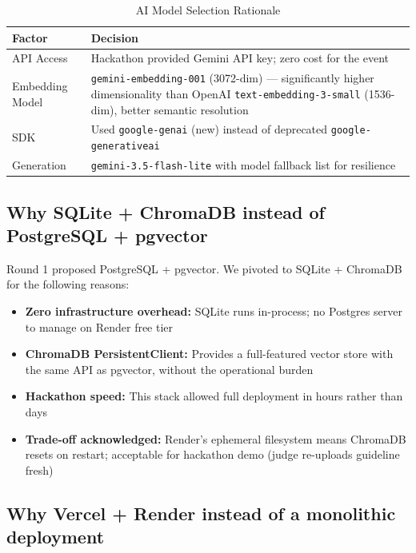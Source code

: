 \documentclass[11pt,a4paper]{article}
\begin{document}
\begin{table}[H]
\centering
\begin{tabular}{p{} p{}}
\toprule
\textbf{Factor} & \textbf{Decision} \\
\midrule
API Access & Hackathon provided Gemini API key; zero cost for the event \\
\addlinespace
Embedding Model & \texttt{gemini-embedding-001} (3072-dim) --- significantly higher dimensionality than OpenAI \texttt{text-embedding-3-small} (1536-dim), better semantic resolution \\
\addlinespace
SDK & Used \texttt{google-genai} (new) instead of deprecated \texttt{google-generativeai} \\
\addlinespace
Generation & \texttt{gemini-3.5-flash-lite} with model fallback list for resilience \\
\bottomrule
\end{tabular}
\caption{AI Model Selection Rationale}
\end{table}

\subsection{Why SQLite + ChromaDB instead of PostgreSQL + pgvector}

Round 1 proposed PostgreSQL + pgvector. We pivoted to SQLite + ChromaDB for the following reasons:

\begin{itemize}
    \item \textbf{Zero infrastructure overhead:} SQLite runs in-process; no Postgres server to manage on Render free tier
    \item \textbf{ChromaDB PersistentClient:} Provides a full-featured vector store with the same API as pgvector, without the operational burden
    \item \textbf{Hackathon speed:} This stack allowed full deployment in hours rather than days
    \item \textbf{Trade-off acknowledged:} Render's ephemeral filesystem means ChromaDB resets on restart; acceptable for hackathon demo (judge re-uploads guideline fresh)
\end{itemize}

\subsection{Why Vercel + Render instead of a monolithic deployment}
\end{document}

